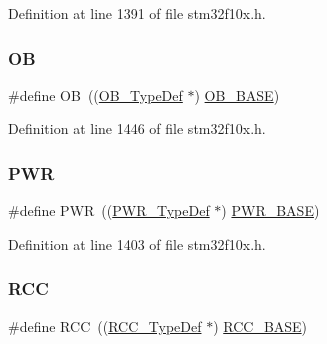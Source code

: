 Definition at line 1391 of file stm32f10x.\+h.

\mbox{\label{group___peripheral__declaration_gad2d5f875cdc6d696735f20fa23a895c3}} 
\subsubsection{\texorpdfstring{OB}{OB}}
{\footnotesize\ttfamily \#define OB~((\hyperlink{struct_o_b___type_def}{O\+B\+\_\+\+Type\+Def} $\ast$) \hyperlink{group___peripheral__memory__map_gab5b5fb155f9ee15dfb6d757da1adc926}{O\+B\+\_\+\+B\+A\+SE})}



Definition at line 1446 of file stm32f10x.\+h.

\mbox{\label{group___peripheral__declaration_ga04651c526497822a859942b928e57f8e}} 
\subsubsection{\texorpdfstring{P\+WR}{PWR}}
{\footnotesize\ttfamily \#define P\+WR~((\hyperlink{struct_p_w_r___type_def}{P\+W\+R\+\_\+\+Type\+Def} $\ast$) \hyperlink{group___peripheral__memory__map_gac691ec23dace8b7a649a25acb110217a}{P\+W\+R\+\_\+\+B\+A\+SE})}



Definition at line 1403 of file stm32f10x.\+h.

\mbox{\label{group___peripheral__declaration_ga74944438a086975793d26ae48d5882d4}} 
\subsubsection{\texorpdfstring{R\+CC}{RCC}}
{\footnotesize\ttfamily \#define R\+CC~((\hyperlink{struct_r_c_c___type_def}{R\+C\+C\+\_\+\+Type\+Def} $\ast$) \hyperlink{group___peripheral__memory__map_ga0e681b03f364532055d88f63fec0d99d}{R\+C\+C\+\_\+\+B\+A\+SE})}



